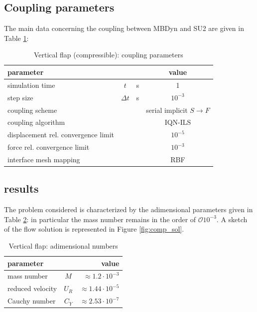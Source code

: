 \subsection{Coupling parameters}

The main data concerning the coupling between MBDyn and SU2 are given in Table \ref{table:comp-coupling}:

\begin{table}[!h]
	\begin{center}
		\begin{tabular}{ l c  l| c } 
			parameter & & & value   \\ 
			\hline
			simulation time  & $t$& \si{s} & 1      \\
			step size & $\Delta t$ & \si{s} & $10^{-3}$   \\
			\hline
			coupling scheme & & & serial implicit $S\rightarrow F$  \\
			coupling algorithm & & &  IQN-ILS  \\
			displacement rel. convergence limit & & & $10^{-5}$ \\
			force rel. convergence limit &&  & $10^{-3}$  \\
      		interface mesh mapping & & & RBF  \\
			
		\end{tabular}
	\end{center}
	\caption{Vertical flap (compressible): coupling parameters}
	\label{table:comp-coupling}
\end{table}


\subsection{results}

The problem considered is characterized by the adimensional parameters given in Table \ref{table:comp-adim}: in particular the mass number remains in the order of $\mathcal{O} 10^{-3}$. A sketch of the flow solution is represented in Figure \ref{fig:comp_sol}.

\begin{table}[!h]
	\begin{center}
		\begin{tabular}{ l c | r } 
			parameter & & value   \\ 
			\hline
			mass number  & $M$ & $ \approx 1.2\cdot 10^{-3}$     \\
			reduced velocity & $U_R$ & $ \approx 1.44\cdot 10^{-5}$  \\
			Cauchy number  & $C_Y$ & $  \approx 2.53 \cdot 10^{-7}$  \\			
		\end{tabular}
	\end{center}
	\caption{Vertical flap: adimensional numbers}
	\label{table:comp-adim}
\end{table}

